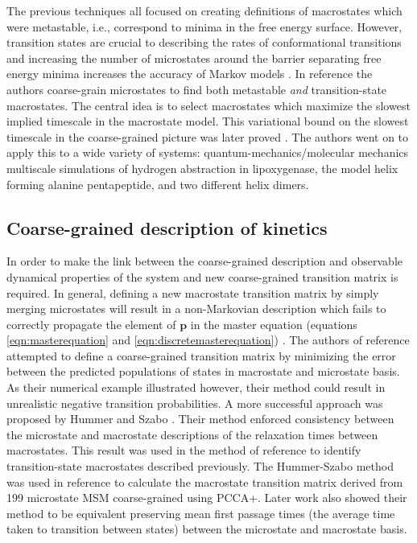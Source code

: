 The previous techniques all focused on creating definitions of macrostates which were metastable, i.e., correspond to minima in the free energy surface. However, transition states are crucial to describing the rates of conformational transitions and increasing the number of microstates around the barrier separating free energy minima increases the accuracy of Markov models \cite{prinzMarkovModelsMolecular2011}.  In reference \cite{martiniVariationalIdentificationMarkovian2017} the authors coarse-grain microstates to find both metastable \emph{and} transition-state macrostates. The central idea is to select macrostates which maximize the slowest implied timescale in the macrostate model. This variational bound on the slowest timescale in the coarse-grained picture was later proved \cite{kellsMeanFirstPassage2019}.  The authors went on to apply this to a wide variety of systems: quantum-mechanics/molecular mechanics multiscale simulations of hydrogen abstraction in lipoxygenase, the model helix forming  alanine pentapeptide, and two different helix dimers. 


\subsection{Coarse-grained description of kinetics}

In order to make the link between the coarse-grained description and observable dynamical properties of the system and new coarse-grained transition matrix is required.   In general, defining a new macrostate transition matrix by simply merging microstates will result in a non-Markovian description which fails to correctly propagate the element of $\mathbf{p}$ in the master equation (equations \ref{eqn:masterequation} and \ref{eqn:discretemasterequation}) \cite{kubeCoarseGrainingMethod2007b, noeProjectedHiddenMarkov2013a}. The authors of reference \cite{kubeCoarseGrainingMethod2007b} attempted to define a coarse-grained transition matrix by minimizing the error between the predicted populations of states in macrostate and microstate basis. As their numerical example illustrated however, their method could result in unrealistic negative transition probabilities.  A more successful approach was proposed by Hummer and Szabo  \cite{hummerOptimalDimensionalityReduction2015a}. Their method enforced consistency between the microstate and macrostate descriptions of the relaxation times between macrostates. This result was used in the method of reference \cite{martiniVariationalIdentificationMarkovian2017} to identify transition-state macrostates described previously. The Hummer-Szabo method was used in reference \cite{jasHelixCoilTransition2018} to calculate the macrostate transition matrix derived from 199 microstate MSM coarse-grained  using PCCA+. Later work also showed \cite{kellsCorrelationFunctionsMean2020} their method to be equivalent preserving mean first passage times (the average time taken to transition between states) between the microstate and macrostate basis. 

